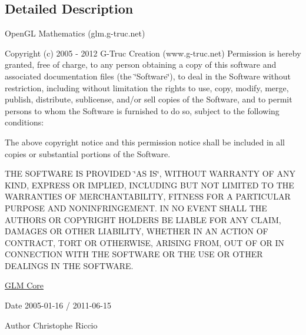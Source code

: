 \subsection{\-Detailed \-Description}
\-Open\-G\-L \-Mathematics (glm.\-g-\/truc.\-net)

\-Copyright (c) 2005 -\/ 2012 \-G-\/\-Truc \-Creation (www.\-g-\/truc.\-net) \-Permission is hereby granted, free of charge, to any person obtaining a copy of this software and associated documentation files (the \char`\"{}\-Software\char`\"{}), to deal in the \-Software without restriction, including without limitation the rights to use, copy, modify, merge, publish, distribute, sublicense, and/or sell copies of the \-Software, and to permit persons to whom the \-Software is furnished to do so, subject to the following conditions\-:

\-The above copyright notice and this permission notice shall be included in all copies or substantial portions of the \-Software.

\-T\-H\-E \-S\-O\-F\-T\-W\-A\-R\-E \-I\-S \-P\-R\-O\-V\-I\-D\-E\-D \char`\"{}\-A\-S I\-S\char`\"{}, \-W\-I\-T\-H\-O\-U\-T \-W\-A\-R\-R\-A\-N\-T\-Y \-O\-F \-A\-N\-Y \-K\-I\-N\-D, \-E\-X\-P\-R\-E\-S\-S \-O\-R \-I\-M\-P\-L\-I\-E\-D, \-I\-N\-C\-L\-U\-D\-I\-N\-G \-B\-U\-T \-N\-O\-T \-L\-I\-M\-I\-T\-E\-D \-T\-O \-T\-H\-E \-W\-A\-R\-R\-A\-N\-T\-I\-E\-S \-O\-F \-M\-E\-R\-C\-H\-A\-N\-T\-A\-B\-I\-L\-I\-T\-Y, \-F\-I\-T\-N\-E\-S\-S \-F\-O\-R \-A \-P\-A\-R\-T\-I\-C\-U\-L\-A\-R \-P\-U\-R\-P\-O\-S\-E \-A\-N\-D \-N\-O\-N\-I\-N\-F\-R\-I\-N\-G\-E\-M\-E\-N\-T. \-I\-N \-N\-O \-E\-V\-E\-N\-T \-S\-H\-A\-L\-L \-T\-H\-E \-A\-U\-T\-H\-O\-R\-S \-O\-R \-C\-O\-P\-Y\-R\-I\-G\-H\-T \-H\-O\-L\-D\-E\-R\-S \-B\-E \-L\-I\-A\-B\-L\-E \-F\-O\-R \-A\-N\-Y \-C\-L\-A\-I\-M, \-D\-A\-M\-A\-G\-E\-S \-O\-R \-O\-T\-H\-E\-R \-L\-I\-A\-B\-I\-L\-I\-T\-Y, \-W\-H\-E\-T\-H\-E\-R \-I\-N \-A\-N \-A\-C\-T\-I\-O\-N \-O\-F \-C\-O\-N\-T\-R\-A\-C\-T, \-T\-O\-R\-T \-O\-R \-O\-T\-H\-E\-R\-W\-I\-S\-E, \-A\-R\-I\-S\-I\-N\-G \-F\-R\-O\-M, \-O\-U\-T \-O\-F \-O\-R \-I\-N \-C\-O\-N\-N\-E\-C\-T\-I\-O\-N \-W\-I\-T\-H \-T\-H\-E \-S\-O\-F\-T\-W\-A\-R\-E \-O\-R \-T\-H\-E \-U\-S\-E \-O\-R \-O\-T\-H\-E\-R \-D\-E\-A\-L\-I\-N\-G\-S \-I\-N \-T\-H\-E \-S\-O\-F\-T\-W\-A\-R\-E.

\hyperlink{group__core}{\-G\-L\-M \-Core}

\begin{DoxyDate}{\-Date}
2005-\/01-\/16 / 2011-\/06-\/15 
\end{DoxyDate}
\begin{DoxyAuthor}{\-Author}
\-Christophe \-Riccio 
\end{DoxyAuthor}
